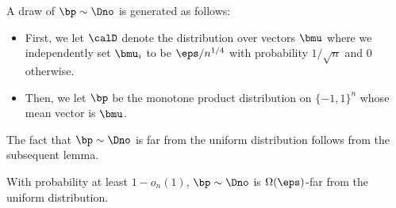 A draw of $\bp \sim \Dno$ is generated as follows:
\begin{flushleft}\begin{itemize}
\item First, we let $\calD$ denote the distribution over vectors $\bmu$ where we 
independently set $\bmu_i$ to be $\eps/n^{1/4}$ with probability $1/\sqrt{n}$ and $0$ otherwise.
\item Then, we let $\bp$ be the monotone product distribution on $\{-1,1\}^n$ whose mean vector is $\bmu$.
\end{itemize}\end{flushleft}
The fact that $\bp \sim \Dno$ is far from the uniform distribution follows from the subsequent lemma.
\begin{lemma}\label{lem:distancelemma}
With probability at least $1 - o_n(1)$, $\bp \sim \Dno$ is $\Omega(\eps)$-far from the uniform distribution.
\end{lemma}
